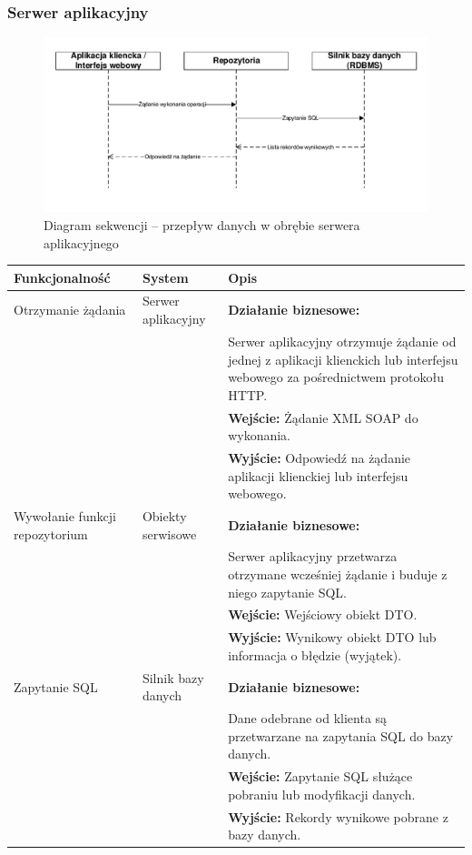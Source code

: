 \documentclass[10pt,a4paper]{article}
\begin{document}
\subsubsection{Serwer aplikacyjny}
\begin{figure}[H]
	\includegraphics[width=16cm]{Resources/PDF/sequence-server.pdf}
	\caption{Diagram sekwencji -- przepływ danych w obrębie serwera aplikacyjnego}
\end{figure}
\begin{table}[H]
	\begin{tabularx}{\textwidth}{|l|l|X|}
		\hline
		\textbf{Funkcjonalność} & \textbf{System} & \textbf{Opis} \\
		\hline
		Otrzymanie żądania &
		Serwer aplikacyjny &
		\textbf{Działanie biznesowe:} \\
		& & Serwer aplikacyjny otrzymuje żądanie od jednej z aplikacji klienckich lub interfejsu webowego za pośrednictwem protokołu HTTP. \\
		& & \textbf{Wejście:} Żądanie XML SOAP do wykonania. \\
		& & \textbf{Wyjście:} Odpowiedź na żądanie aplikacji klienckiej lub interfejsu webowego. \\
		\hline
		Wywołanie funkcji repozytorium &
		Obiekty serwisowe &
		\textbf{Działanie biznesowe:} \\
		& & Serwer aplikacyjny przetwarza otrzymane wcześniej żądanie i buduje z niego zapytanie SQL. \\
		& & \textbf{Wejście:} Wejściowy obiekt DTO. \\
		& & \textbf{Wyjście:} Wynikowy obiekt DTO lub informacja o błędzie (wyjątek). \\
		\hline
		Zapytanie SQL &
		Silnik bazy danych &
		\textbf{Działanie biznesowe:} \\
		& & Dane odebrane od klienta są przetwarzane na zapytania SQL do bazy danych. \\
		& & \textbf{Wejście:} Zapytanie SQL służące pobraniu lub modyfikacji danych. \\
		& & \textbf{Wyjście:} Rekordy wynikowe pobrane z bazy danych. \\
		\hline
	\end{tabularx}
\end{table}
\end{document}
